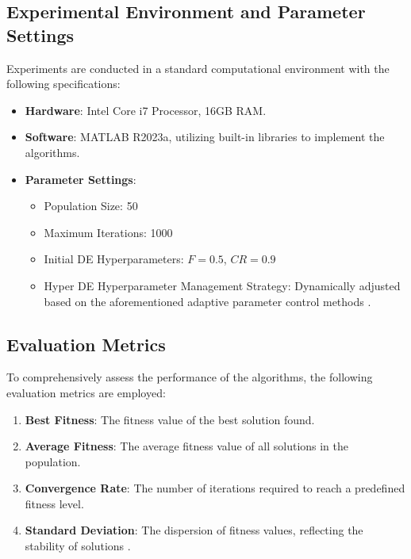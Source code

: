\documentclass[conference]{IEEEtran}
\begin{document}
\subsection{Experimental Environment and Parameter Settings}

Experiments are conducted in a standard computational environment with the following specifications:

\begin{itemize}
    \item \textbf{Hardware}: Intel Core i7 Processor, 16GB RAM.
    \item \textbf{Software}: MATLAB R2023a, utilizing built-in libraries to implement the algorithms.
    \item \textbf{Parameter Settings}:
    \begin{itemize}
        \item Population Size: 50
        \item Maximum Iterations: 1000
        \item Initial DE Hyperparameters: $F = 0.5$, $CR = 0.9$
        \item Hyper DE Hyperparameter Management Strategy: Dynamically adjusted based on the aforementioned adaptive parameter control methods \cite{burke2013hyper, grobler2010alternative}.
    \end{itemize}
\end{itemize}

\subsection{Evaluation Metrics}

To comprehensively assess the performance of the algorithms, the following evaluation metrics are employed:

\begin{enumerate}
    \item \textbf{Best Fitness}: The fitness value of the best solution found.
    \item \textbf{Average Fitness}: The average fitness value of all solutions in the population.
    \item \textbf{Convergence Rate}: The number of iterations required to reach a predefined fitness level.
    \item \textbf{Standard Deviation}: The dispersion of fitness values, reflecting the stability of solutions \cite{burke2013hyper, grobler2010alternative}.
\end{enumerate}
\end{document}
